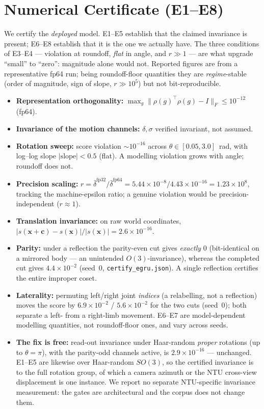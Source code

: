\documentclass[10pt,twocolumn,letterpaper]{article}
\begin{document}
\section{Numerical Certificate (E1--E8)}\label{sec:supp:cert}
We certify the \emph{deployed} model. E1--E5 establish that the claimed invariance is present; E6--E8
establish that it is the one we actually have. The three conditions of E3--E4 --- violation at roundoff,
\emph{flat} in angle, and $r\gg1$ --- are what upgrade ``small'' to ``zero'': magnitude alone would not.
Reported figures are from a representative fp64 run; being roundoff-floor quantities they are
\emph{regime}-stable (order of magnitude, sign of slope, $r\!\gg\!10^{5}$) but not bit-reproducible.
\begin{itemize}\itemsep2pt
\item[E1] \textbf{Representation orthogonality:} $\max_g\|\rho(g)^{\!\top}\rho(g)-I\|_F\le10^{-12}$ (fp64).
\item[E2] \textbf{Invariance of the motion channels:} $\delta,\sigma$ verified invariant, not assumed.
\item[E3] \textbf{Rotation sweep:} score violation $\sim\!10^{-16}$ across $\theta\in[0.05,3.0]$~rad, with
log--log slope $|\text{slope}|<0.5$ (flat). A modelling violation grows with angle; roundoff does not.
\item[E4] \textbf{Precision scaling:} $r=\bar\delta^{\mathrm{fp32}}/\bar\delta^{\mathrm{fp64}}
=5.44\times10^{-8}/4.43\times10^{-16}=1.23\times10^{8}$, tracking the machine-epsilon ratio; a genuine
violation would be precision-independent ($r\approx1$).
\item[E5] \textbf{Translation invariance:} on raw world coordinates,
$|s(\bm x{+}\bm c)-s(\bm x)|/|s(\bm x)|=2.6\times10^{-16}$.
\item[E6] \textbf{Parity:} under a reflection the parity-even cut gives \emph{exactly} $0$ (bit-identical
on a mirrored body --- an unintended $O(3)$-invariance), whereas the completed cut gives
$4.4\times10^{-2}$ (seed~0, \texttt{certify\_egru.json}). A single reflection certifies the entire improper coset.
\item[E7] \textbf{Laterality:} permuting left/right joint \emph{indices} (a relabelling, not a
reflection) moves the score by $6.9\times10^{-2}$ / $5.6\times10^{-2}$ for the two cuts (seed~0); both
separate a left- from a right-limb movement. E6--E7 are model-dependent modelling quantities, not
roundoff-floor ones, and vary across seeds.
\item[E8] \textbf{The fix is free:} read-out invariance under Haar-random \emph{proper} rotations (up to
$\theta{=}\pi$), with the parity-odd channels active, is $2.9\times10^{-16}$ --- unchanged. E1--E5 are
likewise over Haar-random $SO(3)$, so the certified invariance is to the full rotation group, of which a
camera azimuth or the NTU cross-view displacement is one instance. We report no separate NTU-specific
invariance measurement: the gates are architectural and the corpus does not change them.
\end{itemize}
\end{document}
